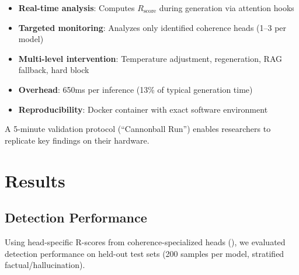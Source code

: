 \documentclass[11pt,twocolumn]{article}
\newcommand{\rscore}{R_{\text{score}}}
\begin{document}
\begin{itemize}
    \item \textbf{Real-time analysis}: Computes $\rscore$ during generation via attention hooks
    \item \textbf{Targeted monitoring}: Analyzes only identified coherence heads (1--3 per model)
    \item \textbf{Multi-level intervention}: Temperature adjustment, regeneration, RAG fallback, hard block
    \item \textbf{Overhead}: 650ms per inference (13\% of typical generation time)
    \item \textbf{Reproducibility}: Docker container with exact software environment
\end{itemize}

A 5-minute validation protocol (``Cannonball Run'') enables researchers to replicate key findings on their hardware.

\section{Results}

\subsection{Detection Performance}

Using head-specific R-scores from coherence-specialized heads (), we evaluated detection performance on held-out test sets (200 samples per model, stratified factual/hallucination).

\begin{table}[h]
\centering
{}
\caption{Detection performance on HaluEval test set.}
\label{tab:performance}
\end{table}
\end{document}
